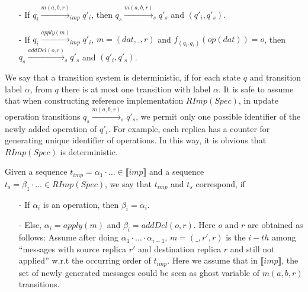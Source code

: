 {{\begin{itemize}
    \begin{itemize}
    \setlength{\itemsep}{0.5pt}
    \item[-] $\forall r \in RId$, $\vert MsgToOp(q_i)(r) \vert = \vert AOpS(q_s)(r) \vert$.

    \item[-] There is a function $f_{(q_i,q_s)}$ that maps the $i-th$ op of $MsgToOp(q_i)(r)$ w.r.t $<_{roi}$ into the $i-th$ op of $AOpS(q_s)(r)$ w.r.t $ro$ for each $i$. Moreover, $o_1 = OpMsgI(q_i)(r_1)$, $o_2 = OpMsgI(q_i)(r_2)$, $r_1 \neq r_2$, and $o_1$ and $o_2$ are mapped from same $dat$, if and only if $f_{(q_i,q_s)}(o_1)=f_{(q_i,q_s)}(o_2)$. We can see that such $f_{(q_i,q_s)}$ is unique if it exists.
    \end{itemize}

\item[-] If $q_i {\xrightarrow{m(a,b,r)}}_{imp} q'_i$, then $q_s {\xrightarrow{m(a,b,r)}}_s q'_s$ and $(q'_i,q'_s)$.

\item[-] If $q_i {\xrightarrow{apply(m)}}_{imp} q'_i$, $m=(dat,\_,r)$ and $f_{(q_i,q_s)}(op(dat))=o$, then $q_s {\xrightarrow{addDel(o,r)}}_s q'_s$ and $(q'_i,q'_s)$.
\end{itemize}

}




We say that a transition system is deterministic, if for each state $q$ and transition label $\alpha$, from $q$ there is at most one transition with label $\alpha$. It is safe to assume that when constructing reference implementation $RImp(Spec)$, in update operation transitions $q_s {\xrightarrow{m(a,b,r)}}_s q'_s$, we permit only one possible identifier of the newly added operation of $q'_i$. For example, each replica has a counter for generating unique identifier of operations. In this way, it is obvious that $RImp(Spec)$ is deterministic.

Given a sequence $t_{imp} = \alpha_1 \cdot \ldots \in \llbracket imp \rrbracket$ and a sequence $t_s = \beta_1 \cdot \ldots \in RImp(Spec)$, we say that $t_{imp}$ and $t_s$ correspond, if

\begin{itemize}
\setlength{\itemsep}{0.5pt}
\item[-] If $\alpha_i$ is an operation, then $\beta_i = \alpha_i$.

\item[-] Else, $\alpha_i = apply(m)$ and $\beta_i = addDel(o,r)$. Here $o$ and $r$ are obtained as follows: Assume after doing $\alpha_1 \cdot \ldots \cdot \alpha_{i-1}$, $m=(\_,r',r)$ is the $i-th$ among ``messages with source replica $r'$ and destination replica $r$ and still not applied'' w.r.t the occurring order of $t_{imp}$. {\color {red}Here we assume that in $\llbracket imp \rrbracket$, the set of newly generated messages could be seen as ghost variable of $m(a,b,r)$ transitions.}


\end{itemize}}
